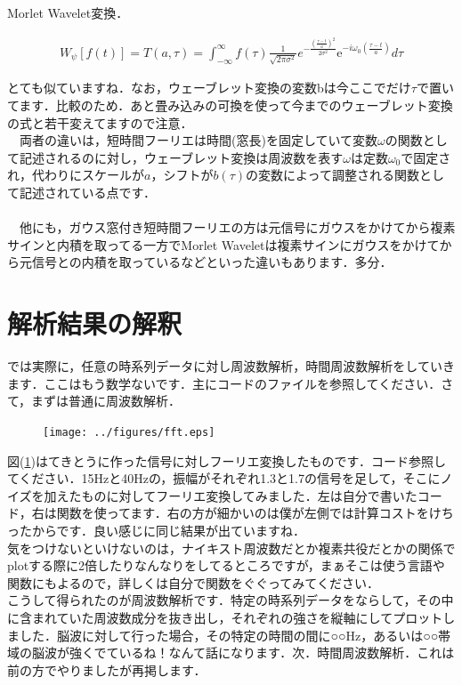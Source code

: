 \documentclass[11pt,a4paper]{ujreport} 	%
\begin{document}
Morlet Wavelet変換．


\begin{eqnarray}
W_\psi[f(t)] = T(a,\tau) =  \int_{-\infty}^{\infty} f(\tau) \frac{1}{\sqrt{2\pi\sigma^2}}e^{-\frac{(\frac{\tau-t}{a})^2}{2\sigma^2}}\mathrm{e}^{-i\omega_0 (\frac{\tau-t}{a})} d\tau
\end{eqnarray}

とても似ていますね．なお，ウェーブレット変換の変数bは今ここでだけ$\tau$で置いてます．比較のため．あと畳み込みの可換を使って今までのウェーブレット変換の式と若干変えてますので注意．\\
　両者の違いは，短時間フーリエは時間(窓長)を固定していて変数$\omega$の関数として記述されるのに対し，ウェーブレット変換は周波数を表す$\omega$は定数$\omega_0$で固定され，代わりにスケールが$a$，シフトが$b(\tau)$の変数によって調整される関数として記述されている点です．\\
\\
　他にも，ガウス窓付き短時間フーリエの方は元信号にガウスをかけてから複素サインと内積を取ってる一方でMorlet Waveletは複素サインにガウスをかけてから元信号との内積を取っているなどといった違いもあります．多分．

\section{解析結果の解釈}
では実際に，任意の時系列データに対し周波数解析，時間周波数解析をしていきます．ここはもう数学ないです．主にコードのファイルを参照してください．さて，まずは普通に周波数解析．

\begin{figure}[H]
  \label{im:fft}
  \centering
  \texttt{[image: ../figures/fft.eps]}
\end{figure}

図(\ref{im:fft})はてきとうに作った信号に対しフーリエ変換したものです．コード参照してください．15Hzと40Hzの，振幅がそれぞれ1.3と1.7の信号を足して，そこにノイズを加えたものに対してフーリエ変換してみました．左は自分で書いたコード，右は関数を使ってます．右の方が細かいのは僕が左側では計算コストをけちったからです．良い感じに同じ結果が出ていますね．\\

気をつけないといけないのは，ナイキスト周波数だとか複素共役だとかの関係でplotする際に2倍したりなんなりをしてるところですが，まぁそこは使う言語や関数にもよるので，詳しくは自分で関数をぐぐってみてください．\\

こうして得られたのが周波数解析です．特定の時系列データをならして，その中に含まれていた周波数成分を抜き出し，それぞれの強さを縦軸にしてプロットしました．脳波に対して行った場合，その特定の時間の間に○○Hz，あるいは○○帯域の脳波が強くでているね！なんて話になります．次．時間周波数解析．これは前の方でやりましたが再掲します．
\end{document}
